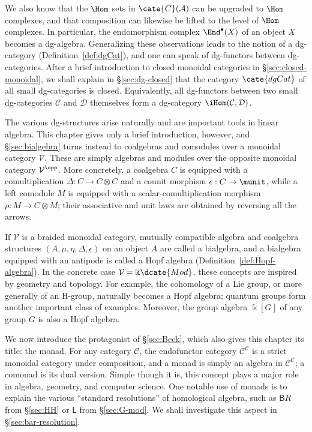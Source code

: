 We also know that the $\Hom$ sets in $\cate{C}(\mathcal{A})$ can be upgraded
to $\Hom$ complexes, and that composition can likewise be lifted to the level
of $\Hom$ complexes. In particular, the endomorphism complex
$\End^\bullet(X)$ of an object $X$ becomes a dg-algebra. Generalizing these
observations leads to the notion of a dg-category
(Definition~\ref{def:dgCat}), and one can speak of dg-functors between
dg-categories. After a brief introduction to closed monoidal categories in
\S\ref{sec:closed-monoidal}, we shall explain in \S\ref{sec:dg-closed} that
the category $\cate{dgCat}$ of all small dg-categories is closed. Equivalently,
all dg-functors between two small dg-categories $\mathcal{C}$ and
$\mathcal{D}$ themselves form a dg-category
$\iHom(\mathcal{C},\mathcal{D})$.

The various dg-structures arise naturally and are important tools in linear
algebra. This chapter gives only a brief introduction, however, and
\S\ref{sec:bialgebra} turns instead to coalgebras and comodules over a
monoidal category $\mathcal{V}$. These are simply algebras and modules over
the opposite monoidal category $\mathcal{V}^{\opp}$. More concretely, a
coalgebra $C$ is equipped with a comultiplication
$\Delta:C\to C\otimes C$ and a counit morphism $\epsilon:C\to\munit$, while
a left comodule $M$ is equipped with a scalar-comultiplication morphism
$\rho:M\to C\otimes M$; their associative and unit laws are obtained by
reversing all the arrows.

If $\mathcal{V}$ is a braided monoidal category, mutually compatible algebra
and coalgebra structures $(A,\mu,\eta,\Delta,\epsilon)$ on an object $A$ are
called a bialgebra, and a bialgebra equipped with an antipode is called a Hopf
algebra (Definition~\ref{def:Hopf-algebra}). In the concrete case
$\mathcal{V}=\Bbbk\dcate{Mod}$, these concepts are inspired by geometry and
topology. For example, the cohomology of a Lie group, or more generally of an
H-group, naturally becomes a Hopf algebra; quantum groups form another
important class of examples. Moreover, the group algebra $\Bbbk[G]$ of any
group $G$ is also a Hopf algebra.

We now introduce the protagonist of \S\ref{sec:Beck}, which also gives this
chapter its title: the monad. For any category $\mathcal{C}$, the endofunctor
category $\mathcal{C}^{\mathcal{C}}$ is a strict monoidal category under
composition, and a monad is simply an algebra in
$\mathcal{C}^{\mathcal{C}}$; a comonad is its dual version. Simple though it
is, this concept plays a major role in algebra, geometry, and computer
science. One notable use of monads is to explain the various “standard
resolutions” of homological algebra, such as $\mathsf{B}R$ from
\S\ref{sec:HH} or $\mathsf{L}$ from \S\ref{sec:G-mod}. We shall investigate
this aspect in \S\ref{sec:bar-resolution}.

